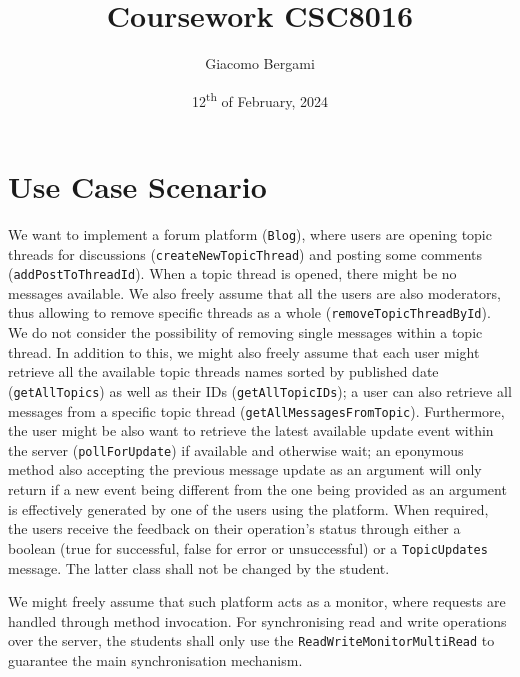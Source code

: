 \documentclass{article}
\title{Coursework CSC8016}
\author{Giacomo Bergami}
\date{12\textsuperscript{th} of February, 2024}
\begin{document}
	\maketitle
	
	\section*{Use Case Scenario}
We want to implement a forum platform (\texttt{Blog}), where users are opening topic threads for discussions (\texttt{createNewTopicThread}) and posting some comments (\texttt{addPostToThreadId}). When a topic thread is opened, there might be no messages available. We also freely assume that all the users are also moderators, thus allowing to remove specific threads as a whole (\texttt{removeTopicThreadById}). We do not consider the possibility of removing single messages within a topic thread. In addition to this, we might also freely assume that each user might retrieve all the available topic threads names sorted by published date (\texttt{getAllTopics}) as well as their IDs (\texttt{getAllTopicIDs}); a user can also retrieve all messages from a specific topic thread (\texttt{getAllMessagesFromTopic}). Furthermore, the user might be also want to retrieve the latest available update event within the server (\texttt{pollForUpdate}) if available and otherwise wait; an eponymous method also accepting the previous message update as an argument will only return if a new event being different from the one being provided as an argument is effectively generated by one of the users using the platform. When required, the users receive the feedback on their operation's status through either a boolean (true for successful, false for error or unsuccessful) or a \texttt{TopicUpdates} message. The latter class shall not be changed by the student. 

We might freely assume that such platform acts as a monitor, where requests are handled through method invocation. For synchronising read and write operations over the server, the students shall only use the \texttt{ReadWriteMonitorMultiRead} to guarantee the main synchronisation mechanism.
\end{document}
